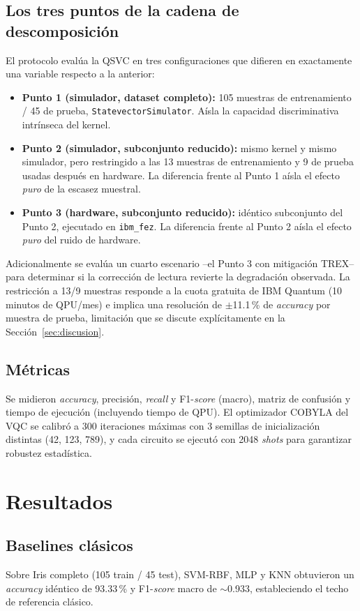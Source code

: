 \documentclass[conference]{IEEEtran}
\begin{document}
\subsection{Los tres puntos de la cadena de descomposición}
El protocolo evalúa la QSVC en tres configuraciones que difieren en exactamente una variable respecto a la anterior:
\begin{itemize}
    \item \textbf{Punto 1 (simulador, dataset completo):} 105 muestras de entrenamiento / 45 de prueba, \texttt{StatevectorSimulator}. Aísla la capacidad discriminativa intrínseca del kernel.
    \item \textbf{Punto 2 (simulador, subconjunto reducido):} mismo kernel y mismo simulador, pero restringido a las 13 muestras de entrenamiento y 9 de prueba usadas después en hardware. La diferencia frente al Punto 1 aísla el efecto \emph{puro} de la escasez muestral.
    \item \textbf{Punto 3 (hardware, subconjunto reducido):} idéntico subconjunto del Punto 2, ejecutado en \texttt{ibm\_fez}. La diferencia frente al Punto 2 aísla el efecto \emph{puro} del ruido de hardware.
\end{itemize}
Adicionalmente se evalúa un cuarto escenario --el Punto 3 con mitigación TREX-- para determinar si la corrección de lectura revierte la degradación observada. La restricción a 13/9 muestras responde a la cuota gratuita de IBM Quantum (10 minutos de QPU/mes) e implica una resolución de $\pm$11.1\,\% de \textit{accuracy} por muestra de prueba, limitación que se discute explícitamente en la Sección~\ref{sec:discusion}.

\subsection{Métricas}
Se midieron \textit{accuracy}, precisión, \textit{recall} y F1-\textit{score} (macro), matriz de confusión y tiempo de ejecución (incluyendo tiempo de QPU). El optimizador COBYLA del VQC se calibró a 300 iteraciones máximas con 3 semillas de inicialización distintas (42, 123, 789), y cada circuito se ejecutó con 2048 \textit{shots} para garantizar robustez estadística.

\section{Resultados}
\label{sec:resultados}

\subsection{Baselines clásicos}
Sobre Iris completo (105 train / 45 test), SVM-RBF, MLP y KNN obtuvieron un \textit{accuracy} idéntico de 93.33\,\% y F1-\textit{score} macro de $\sim$0.933, estableciendo el techo de referencia clásico.
\end{document}
